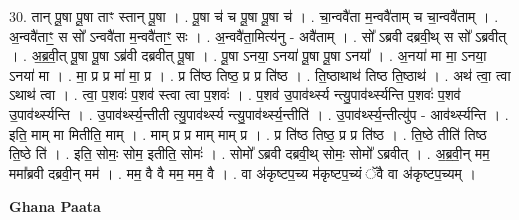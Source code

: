 \documentclass[17pt]{extarticle}
\begin{document}
30. तान् पू॒षा पू॒षा ताꣳ स्तान् पू॒षा । . पू॒षा च॑ च पू॒षा पू॒षा च॑ । . चा॒न्ववै॑ता म॒न्ववै॑ताम् च चा॒न्ववै॑ताम् । . अ॒न्ववै॑ताꣳ॒॒ स सो᳚ ऽन्ववै॑ता म॒न्ववै॑ताꣳ॒॒ सः । . अ॒न्ववै॑ता॒मित्य॑नु - अवै॑ताम् । . सो᳚ ऽब्रवी दब्रवी॒थ् स सो᳚ ऽब्रवीत् । . अ॒ब्र॒वी॒त् पू॒षा पू॒षा ऽब्र॑वी दब्रवीत् पू॒षा । . पू॒षा ऽनया॒ ऽनया॑ पू॒षा पू॒षा ऽनया᳚ । . अ॒नया॑ मा मा॒ ऽनया॒ ऽनया॑ मा । . मा॒ प्र प्र मा॑ मा॒ प्र । . प्र ति॑ष्ठ तिष्ठ॒ प्र प्र ति॑ष्ठ । . ति॒ष्ठाथाथ॑ तिष्ठ ति॒ष्ठाथ॑ । . अथ॑ त्वा॒ त्वा ऽथाथ॑ त्वा । . त्वा॒ प॒शवः॑ प॒शव॑ स्त्वा त्वा प॒शवः॑ । . प॒शव॑ उ॒पाव॑र्थ्स्य न्त्यु॒पाव॑र्थ्स्यन्ति प॒शवः॑ प॒शव॑ उ॒पाव॑र्थ्स्यन्ति । . उ॒पाव॑र्थ्स्य॒न्तीती त्यु॒पाव॑र्थ्स्य न्त्यु॒पाव॑र्थ्स्य॒न्तीति॑ । . उ॒पाव॑र्थ्स्य॒न्तीत्यु॑प - आव॑र्थ्स्यन्ति । . इति॒ माम् मा मितीति॒ माम् । . माम् प्र प्र माम् माम् प्र । . प्र ति॑ष्ठ तिष्ठ॒ प्र प्र ति॑ष्ठ । . ति॒ष्ठे तीति॑ तिष्ठ ति॒ष्ठे ति॑ । . इति॒ सोमः॒ सोम॒ इतीति॒ सोमः॑ । . सोमो᳚ ऽब्रवी दब्रवी॒थ् सोमः॒ सोमो᳚ ऽब्रवीत् । . अ॒ब्र॒वी॒न् मम॒ ममा᳚ब्रवी दब्रवी॒न् मम॑ । . मम॒ वै वै मम॒ मम॒ वै । . वा अ॑कृष्टप॒च्य म॑कृष्टप॒च्यं ॅवै वा अ॑कृष्टप॒च्यम् । \newline

\textbf{Ghana Paata } \newline
\end{document}
